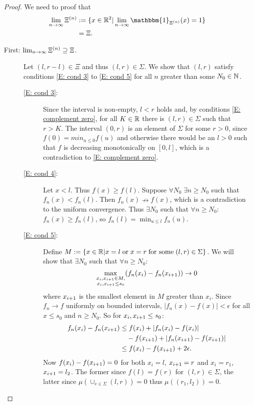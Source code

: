 \begin{proof}
We need to proof that
\begin{equation}
\begin{aligned}
\lim_{n \rightarrow \infty} \Xin 
&:= \lbrace x \in \Real^2 | \lim_{n \rightarrow \infty} \mathbbm{1}_{\Xin}(x) = 1 \rbrace \\ 
&= \Xi.
\end{aligned}
\end{equation}
\begin{description} %
\item[First: $\lim_{n \rightarrow \infty} \Xi^{(n)} \supseteq \Xi$.] 
Let $(l, r-l) \in \Xi$ and thus $(l, r) \in \Sigma$.
We show that $(l,r)$ satisfy conditions \eqref{E: cond 3} to \eqref{E: cond 5} for all $n$ greater than some $N_0 \in \mathbb{N}$.

\begin{description} %
	\item[\eqref{E: cond 3}:] 
Since the interval is non-empty, $l < r$ holds
and, by conditions \eqref{E: complement zero},
for all $K \in \mathbb{R}$ there is $(l,r) \in \Sigma$ such that $r > K$.
The interval $(0,r)$ is an element of $\Sigma$ for some $r>0$, 
since $f(0) = min_{u \leq 0}f(u)$
and otherwise there would be an $l>0$ such that $f$ is decreasing monotonically on $[0,l]$,
which is a contradiction to \eqref{E: complement zero}.
	\item[\eqref{E: cond 4}:]
Let $x < l$. Thus $f(x) \geq f(l)$. 
Suppose $\forall N_0 \; \exists n \geq N_0$ such that
$f_n(x) < f_n(l)$.
Then $f_n(x) \nrightarrow f(x)$, 
which is a contradiction to the uniform convergence.
Thus $\exists N_0$ such that $\forall n \geq N_0$: 
$f_n(x) \geq f_n(l)$, so
$f_n(l) = \min_{u \leq l}f_n(u)$.
	\item[\eqref{E: cond 5}:]
Define $M:=\lbrace x \in \mathbb{R} | x=l \; \text{or} \; x=r \; \text{for some} \; (l,r) \in \Sigma \rbrace$.
We will show that $\exists N_0$ such that $\forall n \geq N_0$:
\begin{equation*}
\max_{\substack{x_i, x_{i+1} \in M, \\ x_i, x_{i+1} \leq s_0}} (f_n(x_i) - f_n(x_{i+1})) \rightarrow 0
\end{equation*}
where $x_{i+1}$ is the smallest element in $M$ greater than $x_i$.
Since $f_n \rightarrow f$ uniformly on bounded intervals, 
$|f_n(x) - f(x)| < \epsilon$ for all $x \leq s_0$ and $n \geq N_0$.
So for $x_i, x_{i+1} \leq s_0$:
\begin{equation}
\begin{aligned}
f_n(x_i) - f_n(x_{i+1}) 
&\leq f(x_i) + |f_n(x_i) - f(x_i)| \\
&\quad - f(x_{i+1}) + |f_n(x_{i+1}) -f(x_{i+1})| \\
&\leq f(x_i) - f(x_{i+1}) + 2\epsilon.
\end{aligned} 
\end{equation}
Now $f(x_i) - f(x_{i+1}) = 0$ for both $x_i = l$, $x_{i+1} = r$ 
and $x_i = r_1$, $x_{i+1} = l_2$. 
The former since $f(l) = f(r)$ for $(l,r) \in \Sigma$,
the latter since $\mu \left(\cup_{e \in \Sigma} (l,r)\right) = 0$
thus $\mu \left( (r_1, l_2) \right) = 0$.


\end{description}
\end{description}
\end{proof}
